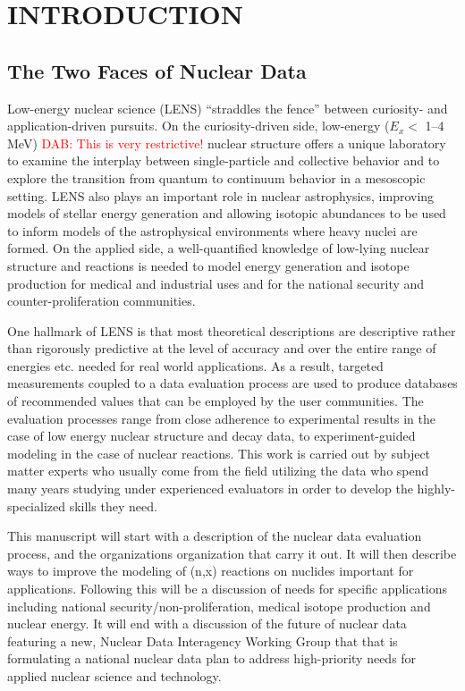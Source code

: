 \documentclass[letterpaper]{ar-1col}
\newcommand{\textred}[1]{\textcolor{red}{ #1}}
\begin{document}
\tableofcontents


\section{INTRODUCTION}

\subsection{The Two Faces of Nuclear Data}


Low-energy nuclear science (LENS) \enquote{straddles the fence} between curiosity- and application-driven pursuits.
 On the curiosity-driven side, low-energy ($E_x <$ 1--4 MeV) \textred{DAB: This is very restrictive!} nuclear structure offers a unique laboratory to examine the interplay between single-particle and collective behavior and to explore the transition from quantum to continuum behavior in a mesoscopic setting.
LENS also plays an important role in nuclear astrophysics, improving models of stellar energy generation and allowing isotopic abundances to be used to inform models of the astrophysical environments where heavy nuclei are formed.
 On the applied side, a well-quantified knowledge of low-lying nuclear structure and reactions is needed to model energy generation and isotope production for medical and industrial uses and for the national security and counter-proliferation communities.
  

One hallmark of LENS is that most theoretical descriptions are descriptive rather than rigorously predictive at the level of accuracy and over the entire range of energies etc. needed for real world applications.
 As a result, targeted measurements coupled to a data evaluation process are used to produce databases of recommended values that can be employed by the user communities.
 The evaluation processes range from close adherence to experimental results in the case of low energy nuclear structure and decay data, to experiment-guided modeling in the case of nuclear reactions.
This work is carried out by subject matter experts who usually come from the field utilizing the data who spend many years studying under experienced evaluators in order to develop the highly-specialized skills they need.
 

This manuscript will start with a description of the nuclear data evaluation process, and the organizations organization that carry it out.
 It will then describe ways to improve the modeling of (n,x) reactions on nuclides important for applications.
 Following this will be a discussion of needs for specific applications including national security/non-proliferation, medical isotope production and nuclear energy.
 It will end with a discussion of the future of nuclear data featuring  a new, Nuclear Data Interagency Working Group that that is formulating a national nuclear data plan to address high-priority needs for applied nuclear science and technology.
  
\end{document}
